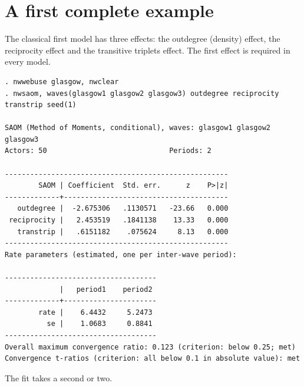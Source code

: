 \section{A first complete example}\label{sec:firstexample}

The classical first model has three effects: the outdegree (density) effect, the reciprocity effect and the transitive triplets effect. The first effect is required in every model.
\begin{lstlisting}
. nwwebuse glasgow, nwclear
. nwsaom, waves(glasgow1 glasgow2 glasgow3) outdegree reciprocity transtrip seed(1)

SAOM (Method of Moments, conditional), waves: glasgow1 glasgow2 glasgow3
Actors: 50                             Periods: 2

-----------------------------------------------------
        SAOM | Coefficient  Std. err.      z    P>|z|
-------------+---------------------------------------
   outdegree |  -2.675306   .1130571   -23.66   0.000
 reciprocity |   2.453519   .1841138    13.33   0.000
   transtrip |   .6151182    .075624     8.13   0.000
-----------------------------------------------------
Rate parameters (estimated, one per inter-wave period):

------------------------------------
             |   period1    period2
-------------+----------------------
        rate |    6.4432     5.2473
          se |    1.0683     0.8841
------------------------------------
Overall maximum convergence ratio: 0.123 (criterion: below 0.25; met)
Convergence t-ratios (criterion: all below 0.1 in absolute value): met
\end{lstlisting}
The fit takes a second or two.

